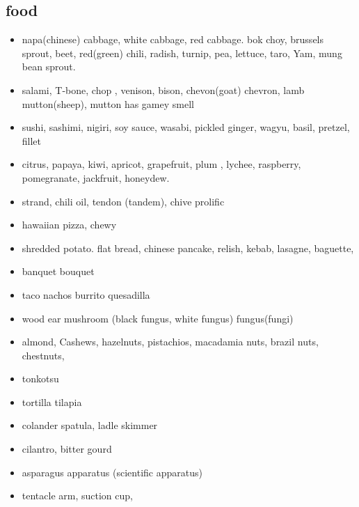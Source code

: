 \documentclass[a4paper,11pt,twoside]{book}
\begin{document}
\subsection{food}
\begin{itemize}
	
	
	\item napa(chinese) cabbage, white cabbage, red cabbage. bok choy, brussels sprout, beet, red(green) chili, radish, turnip, pea, lettuce, taro, Yam, mung bean sprout. 
	
	\item salami, T-bone, chop , venison, bison, chevon(goat) chevron, lamb mutton(sheep), mutton has gamey smell
	
	\item sushi, sashimi, nigiri, soy sauce, wasabi, pickled ginger, wagyu, basil, pretzel, fillet
	
	\item citrus, papaya, kiwi, apricot, grapefruit, plum , lychee, raspberry, pomegranate,  jackfruit, honeydew.  
	
	\item strand, chili oil, tendon (tandem), chive prolific 
	
	\item hawaiian pizza, chewy
	
	\item shredded potato. flat bread, chinese pancake, relish, kebab, lasagne, baguette, 
	
	\item banquet bouquet
	
	\item taco nachos burrito quesadilla
	
	\item wood ear mushroom (black fungus, white fungus) fungus(fungi)
	
	\item almond, Cashews, hazelnuts, pistachios,  macadamia nuts, brazil nuts, chestnuts, 
	
	\item tonkotsu
	
	\item tortilla tilapia 
	
	\item colander spatula, ladle skimmer
	
	\item cilantro, bitter gourd 
	
	\item asparagus apparatus (scientific apparatus)
	\item tentacle arm, suction cup,
	

\end{itemize}
\end{document}
